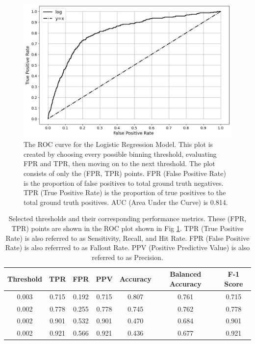 \documentclass[10pt,letterpaper]{article}
\begin{document}
\begin{figure}[htb]
    \centering
    \includegraphics[width=\textwidth]{../img/ROC.png}
    \caption[ROC curve]{The ROC curve for the Logistic Regression Model. This plot is created by choosing every possible binning threshold, evaluating FPR and TPR, then moving on to the next threshold. The plot consists of only the (FPR, TPR) points. FPR (False Positive Rate) is the proportion of false positives to total ground truth negatives. TPR (True Positive Rate) is the proportion of true positives to the total ground truth positives. AUC (Area Under the Curve) is 0.814.}
    \label{fig:ROC}
\end{figure}

\begin{table}[htb]
    \centering
    \begin{tabular}{ccccccc}
        \toprule
        Threshold &   TPR &   FPR & PPV & Accuracy &  Balanced Accuracy & F-1 Score \\
        \midrule
        0.003 & 0.715 & 0.192 & 0.715 &     0.807 &     0.761 & 0.715 \\
        0.002 & 0.778 & 0.255 & 0.778 &     0.745 &     0.762 & 0.778 \\
        0.002 & 0.901 & 0.532 & 0.901 &     0.470 &     0.684 & 0.901 \\
        0.002 & 0.921 & 0.566 & 0.921 &     0.436 &     0.677 & 0.921 \\
        \bottomrule
    \end{tabular}
    \caption{Selected thresholds and their corresponding performance metrics. These (FPR, TPR) points are shown in the ROC plot shown in Fig \ref{fig:ROC}. TPR (True Positive Rate) is also referred to as Sensitivity, Recall, and Hit Rate. FPR (False Positive Rate) is also referrred to as Fallout Rate. PPV (Positive Predictive Value) is also referred to as Precision.}
    \label{tbl:performance}
\end{table}
\end{document}
